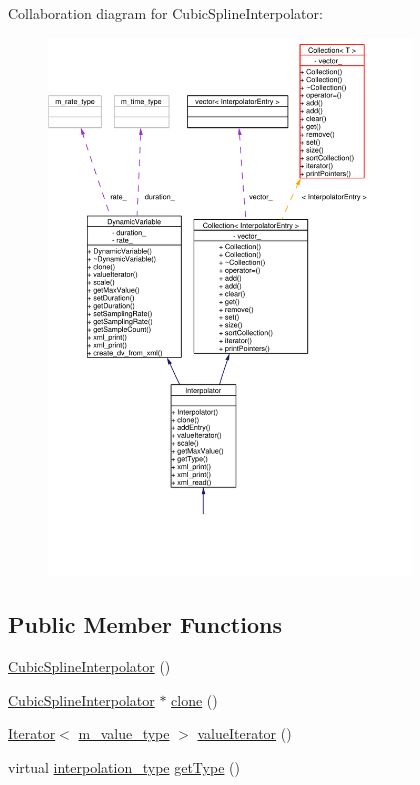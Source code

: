 Collaboration diagram for Cubic\-Spline\-Interpolator:\begin{figure}[H]
\begin{center}
\leavevmode
\includegraphics[width=273pt]{classCubicSplineInterpolator__coll__graph}
\end{center}
\end{figure}
\subsection*{Public Member Functions}
\begin{CompactItemize}
\item 
\hyperlink{classCubicSplineInterpolator_a0}{Cubic\-Spline\-Interpolator} ()
\item 
\hyperlink{classCubicSplineInterpolator}{Cubic\-Spline\-Interpolator} $\ast$ \hyperlink{classCubicSplineInterpolator_a1}{clone} ()
\item 
\hyperlink{classIterator}{Iterator}$<$ \hyperlink{Types_8h_a3}{m\_\-value\_\-type} $>$ \hyperlink{classCubicSplineInterpolator_a2}{value\-Iterator} ()
\item 
virtual \hyperlink{Types_8h_a13}{interpolation\_\-type} \hyperlink{classCubicSplineInterpolator_a3}{get\-Type} ()
\end{CompactItemize}


